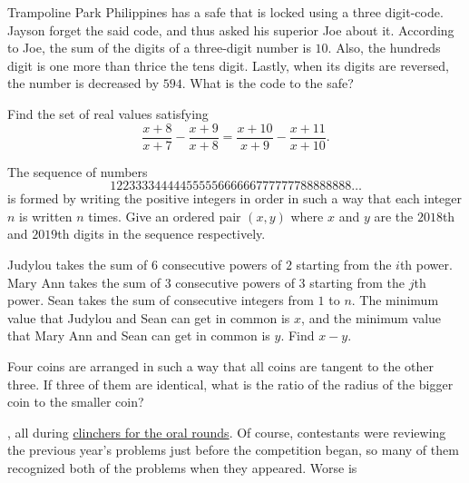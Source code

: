 \documentclass[11pt,paper=letter]{scrartcl}
\begin{document}
\begin{probboxed}
  [Eliminations E9] Trampoline Park Philippines has a safe that is locked using a three digit-code. Jayson forget the said code, and thus asked his superior Joe about it. According to Joe, the sum of the digits of a three-digit number is $10$. Also, the hundreds digit is one more than thrice the tens digit. Lastly, when its digits are reversed, the number is decreased by $594$. What is the code to the safe?
\end{probboxed}
\vspace{-10pt}
\begin{probboxed}
  [Orals T5-1] Find the set of real values satisfying $$\dfrac{x+8}{x+7} - \dfrac{x+9}{x+8} = \dfrac{x+10}{x+9} - \dfrac{x+11}{x+10}.$$
\end{probboxed}
\vspace{-10pt}
\begin{probboxed}
  [Orals T9-3] The sequence of numbers $$12233334444455555666666777777788888888\ldots$$ is formed by writing the positive integers in order in such a way that each integer $n$ is written $n$ times. Give an ordered pair $(x, y)$ where $x$ and $y$ are the $2018$th and $2019$th digits in the sequence respectively.
\end{probboxed}
\vspace{-10pt}
\begin{probboxed}
  [Finals W2-2] Judylou takes the sum of $6$ consecutive powers of $2$ starting from the $i$th power. Mary Ann takes the sum of $3$ consecutive powers of $3$ starting from the $j$th power. Sean takes the sum of consecutive integers from $1$ to $n$. The minimum value that Judylou and Sean can get in common is $x$, and the minimum value that Mary Ann and Sean can get in common is $y$. Find $x - y$.
\end{probboxed}
\vspace{-10pt}
\begin{probboxed}
  [Finals W4-1] Four coins are arranged in such a way that all coins are tangent to the other three. If three of them are identical, what is the ratio of the radius of the bigger coin to the smaller coin?
\end{probboxed}

, all during \href{http://cjquines.com/files/mathira2018orals.pdf}{clinchers for the oral rounds}. Of course, contestants were reviewing the previous year's problems just before the competition began, so many of them recognized both of the problems when they appeared. Worse is
\end{document}
